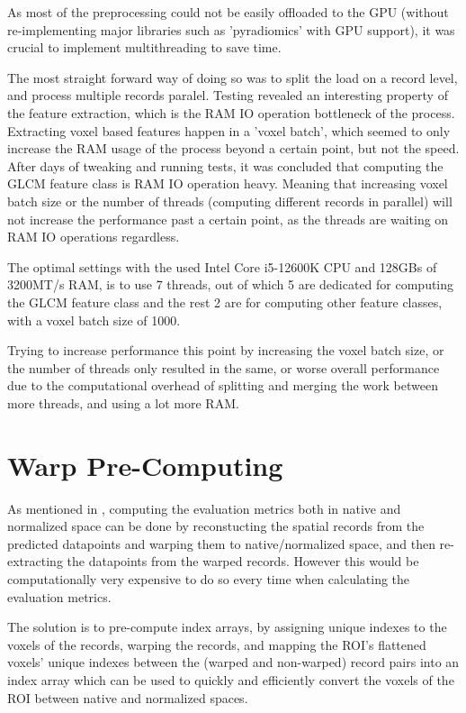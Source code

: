 As most of the preprocessing could not be easily offloaded to the GPU (without re-implementing major libraries such as 'pyradiomics' with GPU support), it was crucial to implement multithreading to save time.\par
The most straight forward way of doing so was to split the load on a record level, and process multiple records paralel. Testing revealed an interesting property of the feature extraction, which is the RAM IO operation bottleneck of the process. Extracting voxel based features happen in a 'voxel batch', which seemed to only increase the RAM usage of the process beyond a certain point, but not the speed. After days of tweaking and running tests, it was concluded that computing the \ac{GLCM} feature class is RAM IO operation heavy. Meaning that increasing voxel batch size or the number of threads (computing different records in parallel) will not increase the performance past a certain point, as the threads are waiting on RAM IO operations regardless.\par
The optimal settings with the used Intel Core i5-12600K CPU and 128GBs of 3200MT/s RAM, is to use 7 threads, out of which 5 are dedicated for computing the \ac{GLCM} feature class and the rest 2 are for computing other feature classes, with a voxel batch size of 1000.\par
Trying to increase performance this point by increasing the voxel batch size, or the number of threads only resulted in the same, or worse overall performance due to the computational overhead of splitting and merging the work between more threads, and using a lot more RAM.

\section{Warp Pre-Computing}
\label{app:imp-pre}

As mentioned in , computing the evaluation metrics both in native and normalized space can be done by reconstucting the spatial records from the predicted datapoints and warping them to native/normalized space, and then re-extracting the datapoints from the warped records. However this would be computationally very expensive to do so every time when calculating the evaluation metrics.\par
The solution is to pre-compute index arrays, by assigning unique indexes to the voxels of the records, warping the records, and mapping the \ac{ROI}'s flattened voxels' unique indexes between the (warped and non-warped) record pairs into an index array which can be used to quickly and efficiently convert the voxels of the \ac{ROI} between native and normalized spaces.

